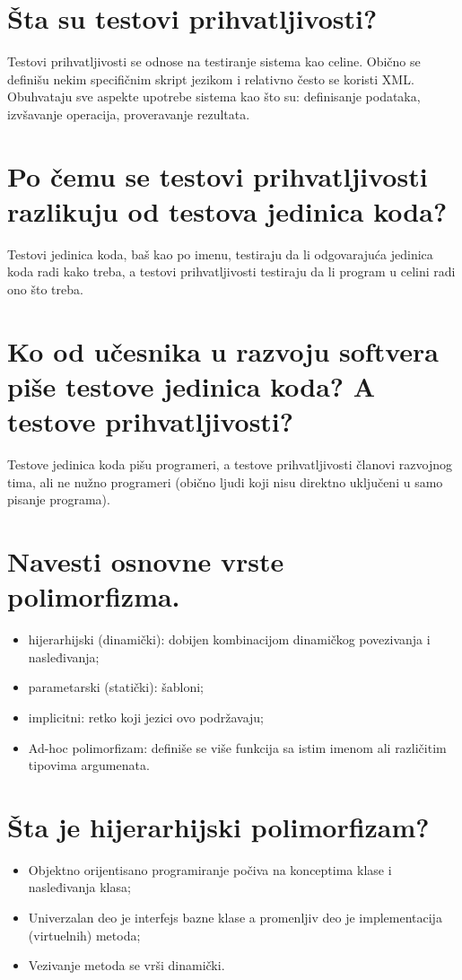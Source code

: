 \documentclass[a4paper]{article}
\begin{document}
\section{Šta su testovi prihvatljivosti?}
  Testovi prihvatljivosti se odnose na testiranje sistema kao celine. Obično se definišu 
  nekim specifičnim skript jezikom i relativno često se koristi XML. Obuhvataju sve aspekte 
  upotrebe sistema kao što su: definisanje podataka, izvšavanje operacija, proveravanje 
  rezultata.

\section{Po čemu se testovi prihvatljivosti razlikuju od testova jedinica koda?}
  Testovi jedinica koda, baš kao po imenu, testiraju da li odgovarajuća jedinica koda 
  radi kako treba, a testovi prihvatljivosti testiraju da li program u celini radi ono
  što treba.

\section{Ko od učesnika u razvoju softvera piše testove jedinica koda? A testove prihvatljivosti?}
  Testove jedinica koda pišu programeri, a testove prihvatljivosti članovi razvojnog tima,
  ali ne nužno programeri (obično ljudi koji nisu direktno uključeni u samo pisanje programa).

\section{Navesti osnovne vrste polimorfizma.}
  \begin{itemize}
    \item hijerarhijski (dinamički): dobijen kombinacijom dinamičkog povezivanja i nasleđivanja;
    \item parametarski (statički): šabloni;
    \item implicitni: retko koji jezici ovo podržavaju;
    \item Ad-hoc polimorfizam: definiše se više funkcija sa istim imenom ali različitim tipovima argumenata.
  \end{itemize}

\section{Šta je hijerarhijski polimorfizam?}
  \begin{itemize}
    \item Objektno orijentisano programiranje počiva na konceptima klase i nasleđivanja klasa;
    \item Univerzalan deo je interfejs bazne klase a promenljiv deo je implementacija (virtuelnih) metoda;
    \item Vezivanje metoda se vrši dinamički. 
  \end{itemize}
\end{document}
